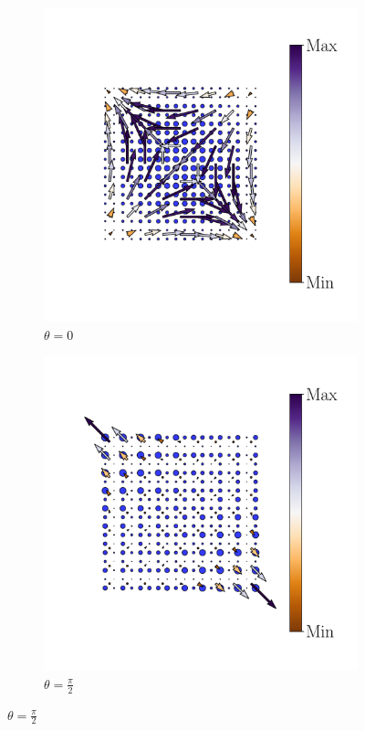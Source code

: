 \begin{figure}[h!]
\begin{minipage}[h!]{1.1\textwidth}
\begin{subfigure}[b!]{0.2 \textwidth}
         \end{subfigure}\hspace*{-0.5em}
          \begin{subfigure}[b!]{0.2 \textwidth}
             \caption*{$\theta = 0$}
             \includegraphics[width=\textwidth]{Imagenes/Resultados_pump_Cuadrado/xy/hoti_pomp_xy_neg3.pdf}
         \end{subfigure}\hspace*{-0.5em}
          \begin{subfigure}[b!]{0.2 \textwidth}
             \caption*{$\theta = \frac{\pi}{2}$}
             \includegraphics[width=\textwidth]{Imagenes/Resultados_pump_Cuadrado/xy/hoti_pomp_xy_neg4.pdf}

\end{subfigure}
\end{minipage}
\end{figure}
